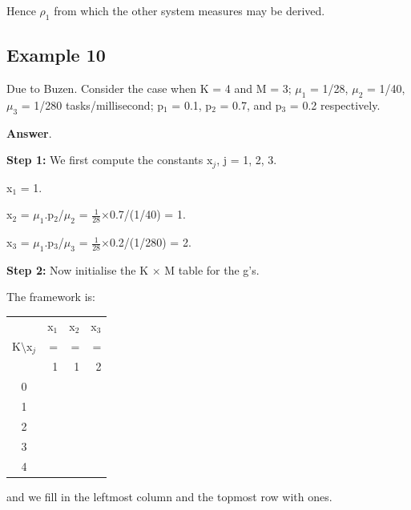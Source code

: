 \documentclass[12pt,fleqn]{report}
\begin{document}
Hence $\rho_1$ from which the other system measures may be derived.


\subsection*{Example 10}

Due to Buzen.
Consider the case when K = 4 and M = 3; 
$\mu_1$ = 1/28,  $\mu_2$ = 1/40,  $\mu_3$ = 1/280 tasks/millisecond;
p$_1$ = 0.1, p$_2$ = 0.7, and p$_3$ = 0.2 respectively.


\noindent
{\bf Answer}.


\noindent
{\bf Step 1:} We first compute the constants x$_j$, j = 1, 2, 3.

x$_1$ = 1.

x$_2$ = $\mu_1$.p$_2$/$\mu_2$ = $\frac{1}{28}$$\times$0.7/(1/40) = 1.

x$_3$ = $\mu_1$.p$_3$/$\mu_3$ = $\frac{1}{28}$$\times$0.2/(1/280) = 2.


\noindent
{\bf Step 2:} Now initialise the K $\times$ M table for the g's.

The framework is:

\begin{center}
\begin{tabular}{|| c |r  r r|| }
\hline
                  & \multicolumn{1}{c}{x$_1$}
                  & \multicolumn{1}{c}{x$_2$}
                  & \multicolumn{1}{c||}{x$_3$}\\

K$\setminus$x$_j$ & =      & =      & =    \\
                  & 1      & 1      & 2     \\
\hline
0                 &        &        &       \\
1                 &        &        &       \\
2                 &        &        &       \\
3                 &        &        &       \\
4                 &        &        &       \\
\hline
\end{tabular}
\end{center}

\noindent
and we fill in the leftmost column and the topmost row with ones.
\end{document}
